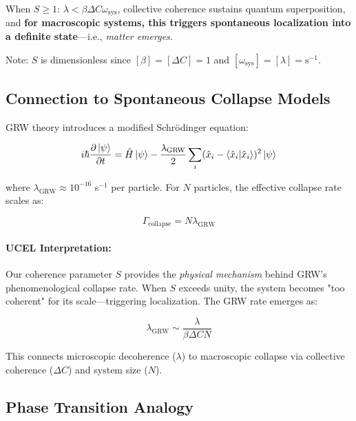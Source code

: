 \documentclass[12pt,a4paper]{article}
\begin{document}
When $S \geq 1$: $\lambda < \beta \Delta C \omega_{\text{sys}}$, collective coherence sustains quantum superposition, and \textbf{for macroscopic systems, this triggers spontaneous localization into a definite state}---i.e., \emph{matter emerges}.

Note: $S$ is dimensionless since $[\beta] = [\Delta C] = 1$ and $[\omega_{\text{sys}}] = [\lambda] = \text{s}^{-1}$.

\subsection{Connection to Spontaneous Collapse Models}

GRW theory introduces a modified Schrödinger equation:

\begin{equation}
i\hbar \frac{\partial \ket{\psi}}{\partial t} = \hat{H} \ket{\psi} - \frac{\lambda_{\text{GRW}}}{2} \sum_i (\hat{x}_i - \braket{\hat{x}_i})^2 \ket{\psi}
\label{eq:grw}
\end{equation}

where $\lambda_{\text{GRW}} \approx 10^{-16}$ s$^{-1}$ per particle. For $N$ particles, the effective collapse rate scales as:

\begin{equation}
\Gamma_{\text{collapse}} = N \lambda_{\text{GRW}}
\label{eq:collapse_rate}
\end{equation}

\paragraph{UCEL Interpretation:}
Our coherence parameter $S$ provides the \emph{physical mechanism} behind GRW's phenomenological collapse rate. When $S$ exceeds unity, the system becomes "too coherent" for its scale---triggering localization. The GRW rate emerges as:

\begin{equation}
\lambda_{\text{GRW}} \sim \frac{\lambda}{\beta \Delta C N}
\label{eq:grw_derived}
\end{equation}

This connects microscopic decoherence ($\lambda$) to macroscopic collapse via collective coherence ($\Delta C$) and system size ($N$).

\subsection{Phase Transition Analogy}
\end{document}
